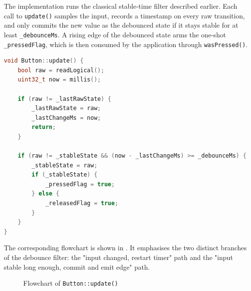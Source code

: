 The implementation runs the classical stable-time filter described earlier. Each call to \texttt{update()} samples the input, records a timestamp on every raw transition, and only commits the new value as the debounced state if it stays stable for at least \texttt{\_debounceMs}. A rising edge of the debounced state arms the one-shot \texttt{\_pressedFlag}, which is then consumed by the application through \texttt{wasPressed()}.

\begin{lstlisting}[language=C++, caption=Button.cpp --- update() function (the debounce filter), label=lst:button_update]
void Button::update() {
    bool raw = readLogical();
    uint32_t now = millis();

    if (raw != _lastRawState) {
        _lastRawState = raw;
        _lastChangeMs = now;
        return;
    }

    if (raw != _stableState && (now - _lastChangeMs) >= _debounceMs) {
        _stableState = raw;
        if (_stableState) {
            _pressedFlag = true;
        } else {
            _releasedFlag = true;
        }
    }
}
\end{lstlisting}

The corresponding flowchart is shown in . It emphasises the two distinct branches of the debounce filter: the "input changed, restart timer" path and the "input stable long enough, commit and emit edge" path.

\begin{figure}[H]
\centering
{}
\caption{Flowchart of \texttt{Button::update()}}
\label{fig:flowchart_button_update}
\end{figure}

